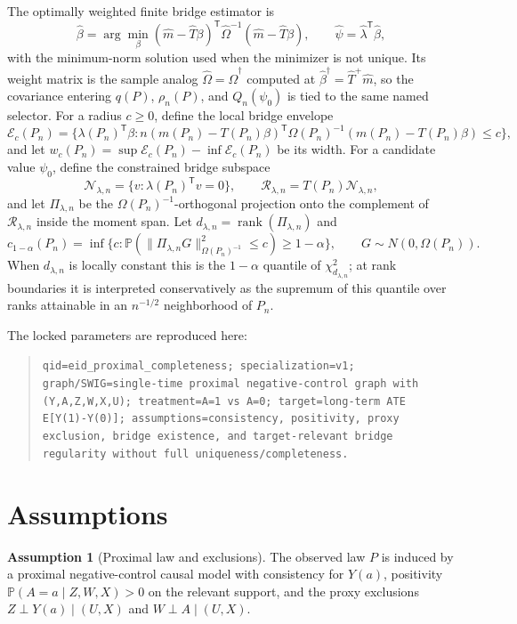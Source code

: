 \documentclass[11pt]{article}
\renewcommand{\Pr}{\mathbb{P}}
\newcommand{\transpose}{\mathsf{T}}
\theoremstyle{definition}
\newtheorem{assumption}{Assumption}
\theoremstyle{plain}
\theoremstyle{remark}
\begin{document}
The optimally weighted finite bridge estimator is
\[
\widehat\beta=
\arg\min_{\beta}
(\widehat m-\widehat T\beta)^\transpose\widehat\Omega^{-1}
(\widehat m-\widehat T\beta),
\qquad
\widehat\psi=\widehat\lambda^\transpose\widehat\beta,
\]
with the minimum-norm solution used when the minimizer is not unique.  Its
weight matrix is the sample analog $\widehat\Omega=\widehat\Omega^\dagger$
computed at $\widehat\beta^\dagger=\widehat T^+\widehat m$, so the covariance
entering $q(P)$, $\rho_n(P)$, and $Q_n(\psi_0)$ is tied to the same named
selector.  For a radius $c\ge0$, define the local bridge envelope
\[
\mathcal E_c(P_n)=
\{\lambda(P_n)^\transpose\beta:
n(m(P_n)-T(P_n)\beta)^\transpose\Omega(P_n)^{-1}
(m(P_n)-T(P_n)\beta)\le c\},
\]
and let $w_c(P_n)=\sup\mathcal E_c(P_n)-\inf\mathcal E_c(P_n)$ be its width.
For a candidate value $\psi_0$, define the constrained bridge subspace
\[
\mathcal N_{\lambda,n}=\{v:\lambda(P_n)^\transpose v=0\},\qquad
\mathcal R_{\lambda,n}=T(P_n)\mathcal N_{\lambda,n},
\]
and let $\Pi_{\lambda,n}$ be the $\Omega(P_n)^{-1}$-orthogonal projection onto
the complement of $\mathcal R_{\lambda,n}$ inside the moment span.  Let
$d_{\lambda,n}=\operatorname{rank}(\Pi_{\lambda,n})$ and
\[
c_{1-\alpha}(P_n)
=\inf\{c:\Pr(\|\Pi_{\lambda,n}G\|_{\Omega(P_n)^{-1}}^2\le c)\ge 1-\alpha\},
\qquad G\sim N(0,\Omega(P_n)).
\]
When $d_{\lambda,n}$ is locally constant this is the
$1-\alpha$ quantile of $\chi^2_{d_{\lambda,n}}$; at rank boundaries it is
interpreted conservatively as the supremum of this quantile over ranks
attainable in an $n^{-1/2}$ neighborhood of $P_n$.

The locked parameters are reproduced here:
\begin{quote}\small
\texttt{qid=eid\_proximal\_completeness; specialization=v1; graph/SWIG=single-time proximal negative-control graph with (Y,A,Z,W,X,U); treatment=A=1 vs A=0; target=long-term ATE E[Y(1)-Y(0)]; assumptions=consistency, positivity, proxy exclusion, bridge existence, and target-relevant bridge regularity without full uniqueness/completeness.}
\end{quote}

\section{Assumptions}
\begin{assumption}[Proximal law and exclusions]\label{ass:proximal-law}
The observed law $P$ is induced by a proximal negative-control causal model
with consistency for $Y(a)$, positivity $\Pr(A=a\mid Z,W,X)>0$ on the relevant
support, and the proxy exclusions $Z\perp Y(a)\mid(U,X)$ and
$W\perp A\mid(U,X)$.
\end{assumption}
\end{document}
